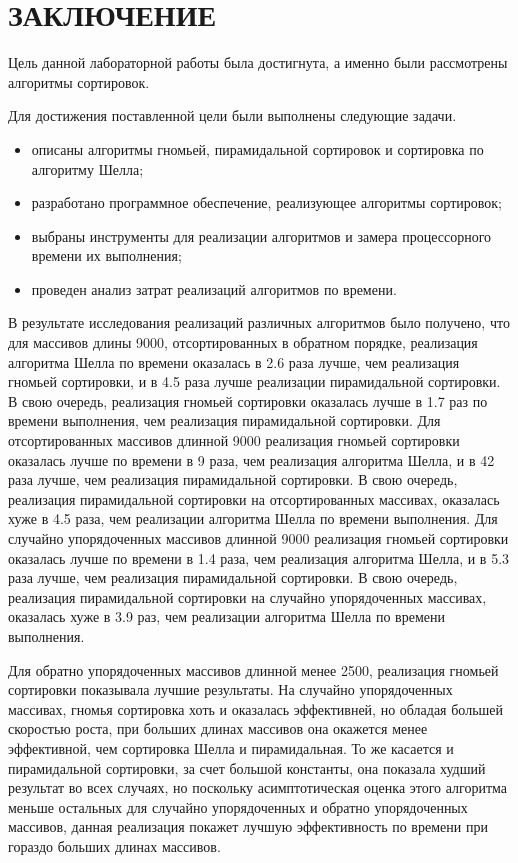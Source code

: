 \chapter*{ЗАКЛЮЧЕНИЕ}

Цель данной лабораторной работы была достигнута, а именно были рассмотрены алгоритмы сортировок.

Для достижения поставленной цели были выполнены следующие задачи.
\begin{itemize}
	\item описаны алгоритмы гномьей, пирамидальной сортировок и сортировка по алгоритму Шелла;
	\item разработано программное обеспечение, реализующее алгоритмы сортировок;
	\item выбраны инструменты для реализации алгоритмов и замера процессорного времени их выполнения;
	\item проведен анализ затрат реализаций алгоритмов по времени. 
\end{itemize}

В результате исследования реализаций различных алгоритмов было получено, что для массивов длины 9000, отсортированных в обратном порядке, реализация алгоритма Шелла по времени оказалась в 2.6 раза лучше, чем реализация гномьей сортировки, и в 4.5 раза лучше реализации пирамидальной сортировки.
В свою очередь, реализация гномьей сортировки оказалась лучше в 1.7 раз по времени выполнения, чем реализация пирамидальной сортировки.
Для отсортированных массивов длинной 9000 реализация гномьей сортировки оказалась лучше по времени в 9 раза, чем реализация алгоритма Шелла, и в 42 раза лучше, чем реализация пирамидальной сортировки. 
В свою очередь, реализация пирамидальной сортировки на отсортированных массивах, оказалась хуже в 4.5 раза, чем реализации алгоритма Шелла по времени выполнения.
Для случайно упорядоченных массивов длинной 9000 реализация гномьей сортировки оказалась лучше по времени в 1.4 раза, чем реализация алгоритма Шелла, и в 5.3 раза лучше, чем реализация пирамидальной сортировки. 
В свою очередь, реализация пирамидальной сортировки на случайно упорядоченных массивах, оказалась хуже в 3.9 раз, чем реализации алгоритма Шелла по времени выполнения.

Для обратно упорядоченных массивов длинной менее 2500, реализация гномьей сортировки показывала лучшие результаты. 
На случайно упорядоченных массивах, гномья сортировка хоть и оказалась эффективней, но обладая большей скоростью роста, при больших длинах массивов она окажется менее эффективной, чем сортировка Шелла и пирамидальная. 
То же касается и пирамидальной сортировки, за счет большой константы, она показала худший результат во всех случаях, но поскольку асимптотическая оценка этого алгоритма меньше остальных для случайно упорядоченных и обратно упорядоченных массивов, данная реализация покажет лучшую эффективность по времени при гораздо больших длинах массивов.
